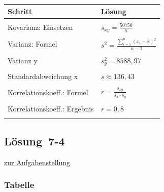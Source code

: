 \documentclass[
  11pt,
  ngerman,
  a4paper,
]{report}
\begin{document}
\begin{table}[H]
\centering
\begin{tabular}{>{\raggedright\arraybackslash}p{8cm}>{\raggedright\arraybackslash}p{8cm}}
\toprule
\textbf{Schritt} & \textbf{Lösung}\\
\midrule
\cellcolor{gray!6}{Kovarianz: Formel} & \cellcolor{gray!6}{$s_{xy}=\frac{\displaystyle \sum_{i=1}^{n}(x_{i}- \bar{x})\cdot(y_{i}-\bar{y})}{n-1}$}\\
Kovarianz: Einsetzen & $s_{xy}=\frac{50750}{5}$\\
\cellcolor{gray!6}{Kovarianz: Ergebnis} & \cellcolor{gray!6}{$s_{xy}=10150$}\\
Varianz: Formel & $s^2=\frac{\sum\limits_{i=1}^{n}(x_{i}-\bar{x})^2}{n-1}$\\
\cellcolor{gray!6}{Varianz x} & \cellcolor{gray!6}{$s^2_x=18614$}\\
Varianz y & $s^2_y=8588{,}97$\\
\cellcolor{gray!6}{Standardabweichung: Formel} & \cellcolor{gray!6}{$s=\sqrt{s^2}$}\\
Standardabweichung x & $s\approx136{,}43$\\
\cellcolor{gray!6}{Standardabweichung y} & \cellcolor{gray!6}{$s_y\approx92{,}68$}\\
Korrelationskoeff.: Formel & $r=\frac{s_{xy}}{s_x \cdot s_y}$\\
\cellcolor{gray!6}{Korrelationskoeff.: Einsetzen} & \cellcolor{gray!6}{$r=\frac{10150}{136{,}43 \cdot 92{,}68}$}\\
Korrelationskoeff.: Ergebnis & $r=0{,}8$\\
\cellcolor{gray!6}{Antwortsatz} & \cellcolor{gray!6}{Es lässt sich eine mäßig starke positive Korrelation zwischen Fläche und Kosten feststellen.}\\
\bottomrule
\end{tabular}
\end{table}

\hypertarget{loesung-7-4}{%
\subsection{Lösung~7-4}\label{loesung-7-4}}

\protect\hyperlink{aufgabe-7-4}{zur Aufgabenstellung}

\hypertarget{tabelle-1}{%
\subsubsection{Tabelle}\label{tabelle-1}}
\end{document}
